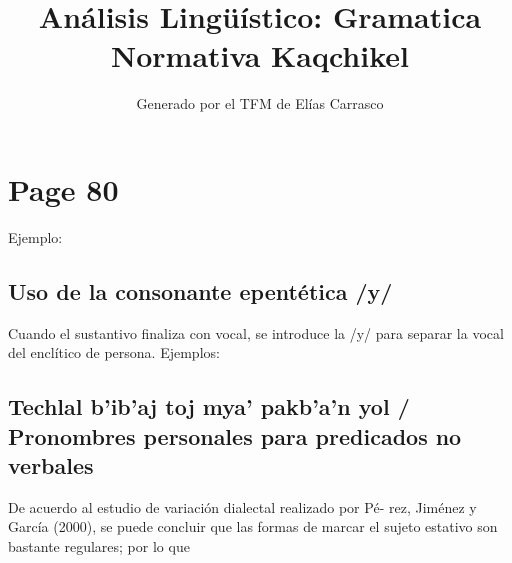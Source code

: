 \documentclass{article}%
\title{Análisis Lingüístico: Gramatica Normativa Kaqchikel}%
\author{Generado por el TFM de Elías Carrasco}%
\begin{document}
%
\normalsize%
\maketitle%
\section{Page 80}%
\label{sec:Page80}%
Ejemplo: %
\subsection{Uso de la consonante epentética /y/}%
\label{subsec:Usodelaconsonanteepenttica/y/}%

%
Cuando el sustantivo finaliza con vocal, se introduce la /y/ para %
separar la vocal del enclítico de persona. %
Ejemplos: %
\subsection{Techlal b’ib’aj toj mya’ pakb’a’n yol / Pronombres personales para predicados no verbales}%
\label{subsec:Techlalbibajtojmyapakbanyol/Pronombrespersonalesparapredicadosnoverbales}%

%
De acuerdo al estudio de variación dialectal realizado por Pé{-} %
rez, Jiménez y García (2000), se puede concluir que las formas %
de marcar el sujeto estativo son bastante regulares; por lo que 

%
\end{document}
